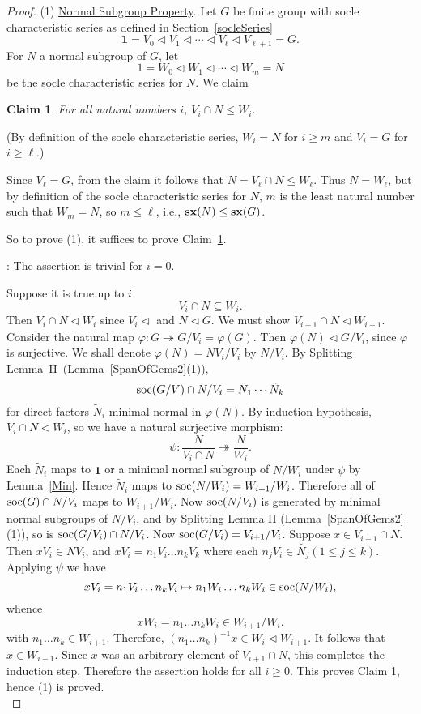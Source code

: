 \documentclass[a4paper,11pt]{amsart}
\newtheorem{claim}{Claim}
\theoremstyle{definition}
\newcommand{\sx}{{\bf sx}}
\newcommand{\soc}{\mbox{\rm soc}}
\newcommand{\sur}{\twoheadrightarrow}
\newcommand{\1}{{\mathbf 1}}
\begin{document}
\begin{proof} 
\noindent
 (1) \underline{Normal Subgroup Property}.    
Let  $G$ be finite group with socle
characteristic series as defined in Section~\ref{socleSeries} 
$$ \1=V_0\lhd V_1 \lhd \cdots \lhd V_{\ell} \lhd V_{\ell+1}=G.$$ 
For $N$ a normal subgroup of $G$, let
$$1 =W_0 \lhd W_1 \lhd \cdots \lhd W_{m} =N$$
be the socle characteristic series for $N$.   We claim
  
\begin{claim}\label{Nclaim}
For all natural numbers $i$, 
$V_i \cap N \leq W_i.$
\end{claim}
\noindent (By definition of the socle characteristic series, $W_i=N$ for $i\geq m$ and $V_i=G$ for $i\geq \ell$.)


Since $V_{\ell}=G$, from the claim it follows that $N=V_{\ell}\cap N \leq W_{\ell}$.  Thus $N=W_{\ell}$, but by definition of the socle characteristic series for $N$, $m$ is the least natural number such that
$W_m=N$, so $m \leq \ell$, i.e., $\sx(N)\leq \sx(G)$.

So to prove (1), it suffices to  prove Claim~\ref{Nclaim}. 

:
The assertion is trivial for $i=0$.

Suppose it is true up to $i$
 $$ V_i\cap N \subseteq W_i.$$
 Then $V_i \cap N \lhd W_i$ since $V_i \lhd$ and $N \lhd G$.    We must show $V_{i+1} \cap N \lhd W_{i+1}$.
 Consider the natural map $\varphi: G\sur G/V_i = \varphi(G)$.  Then $\varphi(N)\lhd G/V_i$, since $\varphi$ is surjective.
We shall denote $\varphi(N) =NV_i/V_i$ by $N/V_i$. 
By Splitting Lemma~II~(Lemma~\ref{SpanOfGems2}(1)), 
$$\soc(G/V) \cap N/V_i= \tilde{N}_1\cdots \tilde{N}_k$$ for direct factors $\tilde{N}_i$ minimal normal in $\varphi(N)$.  
By induction hypothesis, $V_i\cap N \lhd W_i$, so we have a natural surjective morphism:
$$\psi: \frac{N}{V_i\cap N}{\sur} \frac{N}{W_i}.$$
Each $\tilde{N}_i$ maps to $\1$ or a minimal normal subgroup of $N/W_i$ under $\psi$ by Lemma~\ref{Min}.
Hence $\tilde{N}_i$ maps to $\soc(N/W_i)=W_{i+1}/W_i$.
Therefore all of $\soc(G)\cap N/V_i$ maps to $W_{i+1}/W_i$. Now $\soc(N/V_i)$ is generated by minimal normal subgroups of $N/V_i$, and by Splitting Lemma II (Lemma~\ref{SpanOfGems2}(1)), so is $\soc(G/V_i) \cap N/V_i$. 
Now $\soc(G/V_i)=V_{i+1}/V_i$.  Suppose $x\in V_{i+1} \cap N$.   
Then $xV_i \in NV_i$,  and $x V_i = n_1 V_i \ldots n_kV_k$ where each $n_j V_i \in \tilde{N_j} (1\leq j \leq k)$. Applying $\psi$ we have 
 $$x V_i = n_1 V_i \ldots n_kV_i \mapsto n_1 W_i \ldots n_k W_i \in \soc(N/W_i),$$
 whence $$xW_i = n_1 \ldots n_k W_i \in W_{i+1}/W_i.$$
 with $n_1\ldots n_k \in W_{i+1}$. Therefore,
 $(n_1\ldots n_k)^{-1}x \in W_i \lhd W_{i+1}$.
 It follows that $x \in W_{i+1}$. Since $x$ was an arbitrary element of $V_{i+1}\cap N$, this completes the induction step. Therefore the assertion holds for all $i\geq 0$.  This proves Claim 1, hence (1) is proved.\\



\end{proof}
\end{document}
